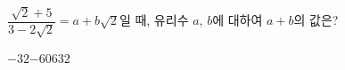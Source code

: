 $\dfrac{\sqrt{2}+5}{3-2\sqrt{2}}=a+b\sqrt{2}$일 때, 유리수 $a$, $b$에 대하여 $a+b$의 값은?
\begin{choices32}{$-32$}{$-6$}{$0$}{$6$}{$32$}\end{choices32}
